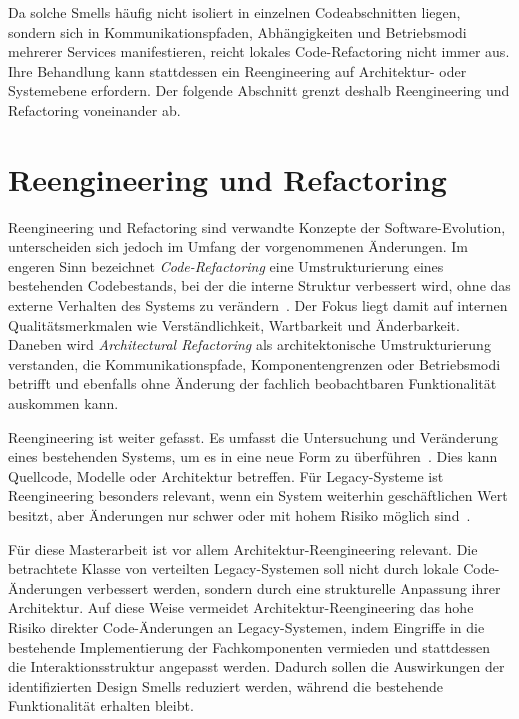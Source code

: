 Da solche Smells häufig nicht isoliert in einzelnen Codeabschnitten liegen, sondern sich in Kommunikationspfaden, Abhängigkeiten und Betriebsmodi mehrerer Services manifestieren, reicht lokales Code-Refactoring nicht immer aus. Ihre Behandlung kann stattdessen ein Reengineering auf Architektur- oder Systemebene erfordern. Der folgende Abschnitt grenzt deshalb Reengineering und Refactoring voneinander ab.

\section{Reengineering und Refactoring}
\label{sec:reengineering_refactoring}

Reengineering und Refactoring sind verwandte Konzepte der Software-Evo\-lu\-ti\-on, unterscheiden sich jedoch im Umfang der vorgenommenen Änderungen. Im engeren Sinn bezeichnet \textit{Code-Refactoring} eine Umstrukturierung eines bestehenden Codebestands, bei der die interne Struktur verbessert wird, ohne das externe Verhalten des Systems zu verändern~\citep{laguna_systematic_2013}. Der Fokus liegt damit auf internen Qua\-li\-täts\-merk\-ma\-len wie Verständlichkeit, Wartbarkeit und Änderbarkeit. Daneben wird \textit{Architectural Refactoring} als architektonische Umstrukturierung verstanden, die Kommunikationspfade, Komponentengrenzen oder Betriebsmodi betrifft und ebenfalls ohne Änderung der fachlich beobachtbaren Funktionalität auskommen kann.

Reengineering ist weiter gefasst. Es umfasst die Untersuchung und Ver\-än\-de\-rung eines bestehenden Systems, um es in eine neue Form zu überführen~\citep{laguna_systematic_2013}. Dies kann Quellcode, Modelle oder Architektur betreffen. Für Legacy-Systeme ist Reengineering besonders relevant, wenn ein System weiterhin geschäftlichen Wert besitzt, aber Änderungen nur schwer oder mit hohem Risiko möglich sind~\citep{stevens_systems_1998}.

Für diese Masterarbeit ist vor allem Architektur-Reengineering relevant. Die betrachtete Klasse von verteilten Legacy-Systemen soll nicht durch lokale Code-Än\-de\-run\-gen verbessert werden, sondern durch eine strukturelle Anpassung ihrer Architektur. Auf diese Weise vermeidet Architektur-Reengineering das hohe Risiko direkter Code-Änderungen an Legacy-Systemen, indem Eingriffe in die bestehende Implementierung der Fachkomponenten vermieden und stattdessen die Interaktionsstruktur angepasst werden. Dadurch sollen die Auswirkungen der identifizierten Design Smells reduziert werden, während die bestehende Funktionalität erhalten bleibt.

